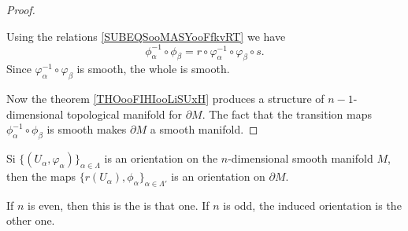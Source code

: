 \begin{proof}
\begin{subproof}
		Using the relations \eqref{SUBEQSooMASYooFfkvRT} we have
		\begin{equation}
			\phi_{\alpha}^{-1}\circ\phi_{\beta}=r\circ \varphi_{\alpha}^{-1}\circ\varphi_{\beta}\circ s.
		\end{equation}
		Since \( \varphi_{\alpha}^{-1}\circ\varphi_{\beta}\) is smooth, the whole is smooth.
	\end{subproof}
	Now the theorem \ref{THOooFIHIooLiSUxH} produces a structure of \( n-1\)-dimensional topological manifold for \( \partial M\). The fact that the transition maps \( \phi_{\alpha}^{-1}\circ\phi_{\beta}\) is smooth makes \( \partial M\) a smooth manifold.
\end{proof}

\begin{theorem}	\label{THOooENBHooOfBTlA}
	Si \( \{ (U_{\alpha}, \varphi_{\alpha}) \}_{\alpha\in \Lambda}\) is an orientation on the \( n\)-dimensional smooth manifold \( M\), then the maps \( \{ r(U_{\alpha}), \phi_{\alpha} \}_{\alpha\in \Lambda'}\) is an orientation on \( \partial M\).

	If \( n\) is even, then this is the  is that one. If \( n\) is odd, the induced orientation is the other one.
\end{theorem}

